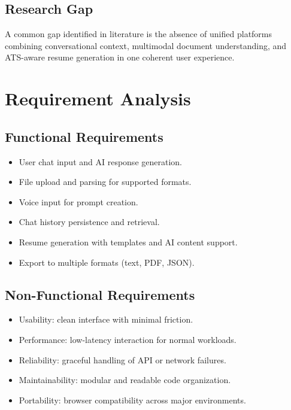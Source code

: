 \documentclass[12pt,a4paper]{report}
\begin{document}
\section{Research Gap}
A common gap identified in literature is the absence of unified platforms combining conversational context, multimodal document understanding, and ATS-aware resume generation in one coherent user experience.

\chapter{Requirement Analysis}
\section{Functional Requirements}
\begin{itemize}
  \item User chat input and AI response generation.
  \item File upload and parsing for supported formats.
  \item Voice input for prompt creation.
  \item Chat history persistence and retrieval.
  \item Resume generation with templates and AI content support.
  \item Export to multiple formats (text, PDF, JSON).
\end{itemize}

\section{Non-Functional Requirements}
\begin{itemize}
  \item Usability: clean interface with minimal friction.
  \item Performance: low-latency interaction for normal workloads.
  \item Reliability: graceful handling of API or network failures.
  \item Maintainability: modular and readable code organization.
  \item Portability: browser compatibility across major environments.
\end{itemize}
\end{document}
